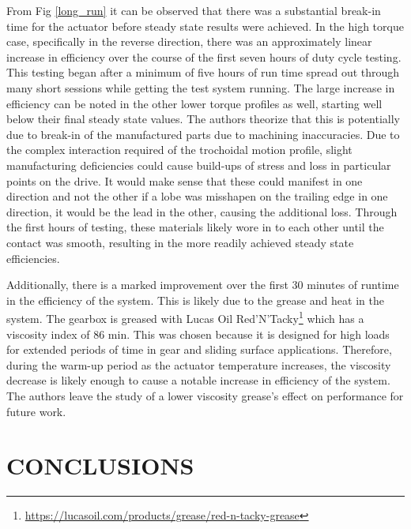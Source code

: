 \documentclass[letterpaper, 10 pt, conference]{ieeeconf}  %
\begin{document}
From Fig \ref{long_run} it can be observed that there was a substantial break-in time for the actuator before steady state results were achieved. In the high torque case, specifically in the reverse direction, there was an approximately linear increase in efficiency over the course of the first seven hours of duty cycle testing. This testing began after a minimum of five hours of run time spread out through many short sessions while getting the test system running. The large increase in efficiency can be noted in the other lower torque profiles as well, starting well below their final steady state values. The authors theorize that this is potentially due to break-in of the manufactured parts due to machining inaccuracies. Due to the complex interaction required of the trochoidal motion profile, slight manufacturing deficiencies could cause build-ups of stress and loss in particular points on the drive. It would make sense that these could manifest in one direction and not the other if a lobe was misshapen on the trailing edge in one direction, it would be the lead in the other, causing the additional loss. Through the first hours of testing, these materials likely wore in to each other until the contact was smooth, resulting in the more readily achieved steady state efficiencies. 

Additionally, there is a marked improvement over the first 30 minutes of runtime in the efficiency of the system. This is likely due to the grease and heat in the system. The gearbox is greased with Lucas Oil Red'N'Tacky\footnote{\url{https://lucasoil.com/products/grease/red-n-tacky-grease}} which has a viscosity index of 86 min. This was chosen because it is designed for high loads for extended periods of time in gear and sliding surface applications. Therefore, during the warm-up period as the actuator temperature increases, the viscosity decrease is likely enough to cause a notable increase in efficiency of the system. The authors leave the study of a lower viscosity grease's effect on performance for future work. 

\section{CONCLUSIONS}
\end{document}
